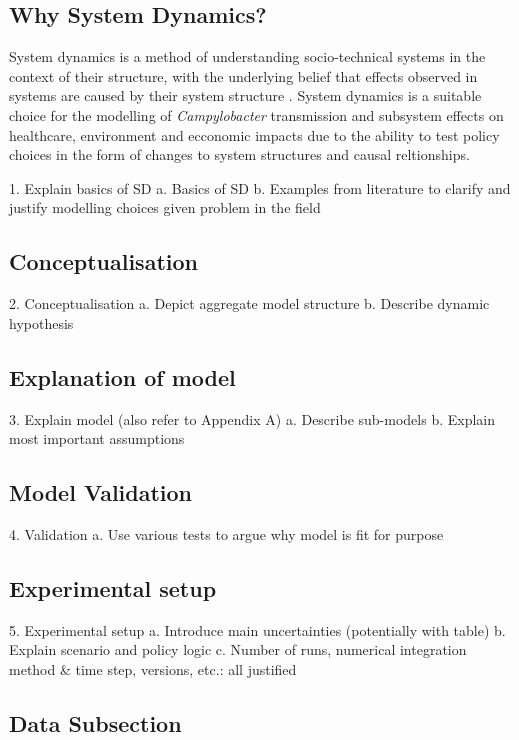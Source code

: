 
\subsection{Why System Dynamics?}
System dynamics is a method of understanding socio-technical systems in the context of their structure, with the underlying belief that effects observed in systems are caused by their system structure \parencite{pruyt_triple_2013}. System dynamics is a suitable choice for the modelling of \textit{Campylobacter} transmission and subsystem effects on healthcare, environment and ecconomic impacts due to the ability to test policy choices in the form of changes to system structures and causal reltionships.

1.	Explain basics of SD
    a.	Basics of SD
    b.	Examples from literature to clarify and justify modelling choices given problem in the field
    
\subsection{Conceptualisation}
2.	Conceptualisation
    a.	Depict aggregate model structure
    b.	Describe dynamic hypothesis
    
\subsection{Explanation of model}
3.	Explain model (also refer to Appendix A)
    a.	Describe sub-models
    b.	Explain most important assumptions
    
\subsection{Model Validation}
4.	Validation
    a.	Use various tests to argue why model is fit for purpose
    
\subsection{Experimental setup}
5.	Experimental setup
    a.	Introduce main uncertainties (potentially with table)
    b.	Explain scenario and policy logic
    c.	Number of runs, numerical integration method & time step, versions, etc.: all justified

\subsection{Data Subsection}
\blindtext

